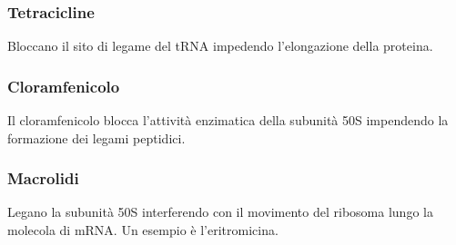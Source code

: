 \subsubsection{Tetracicline}
Bloccano il sito di legame del tRNA impedendo l'elongazione della proteina.
\subsubsection{Cloramfenicolo}
Il cloramfenicolo blocca l'attività enzimatica della subunità 50S impendendo la formazione dei legami peptidici. 
\subsubsection{Macrolidi}
Legano la subunità 50S interferendo con il movimento del ribosoma lungo la molecola di mRNA. Un esempio è l'eritromicina.
